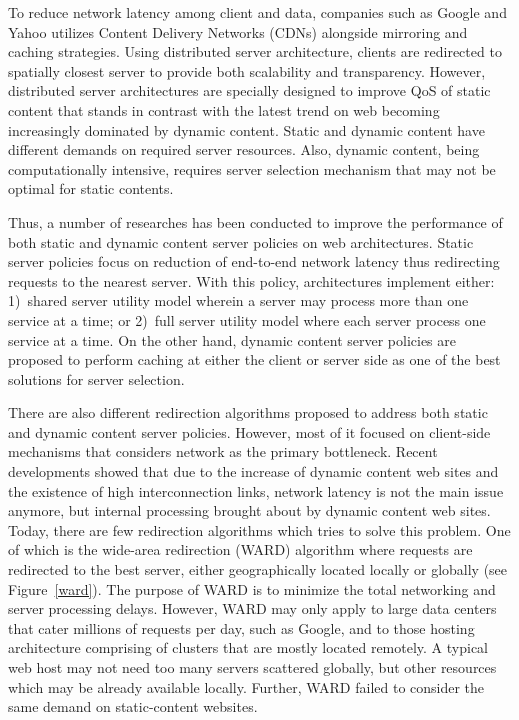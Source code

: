 \documentclass[preprint]{acm_proc_article-sp}
\begin{document}
To reduce network latency among client and data, companies such as Google and Yahoo utilizes Content Delivery Networks (CDNs) alongside mirroring and caching strategies. Using distributed server architecture, clients are redirected to spatially closest server to provide both scalability and transparency. However, distributed server architectures are specially designed to improve QoS of static content that stands in contrast with the latest trend on web becoming increasingly dominated by dynamic content. Static and dynamic content have different demands on required server resources. Also, dynamic content, being computationally intensive, requires server selection mechanism that may not be optimal for static contents.

Thus, a number of researches has been conducted to improve the performance of both static and dynamic content server policies on web architectures.  Static server policies focus on reduction of end-to-end network latency thus redirecting requests to the nearest server. With this policy, architectures implement either: 1)~shared server utility model wherein a server may process more than one service at  a time; or 2)~full server utility model where each server process one service at a time. On the other hand, dynamic content server policies are proposed to perform caching at either the client or server side as one of the best solutions for server selection.

There are also different redirection algorithms proposed to address both static and dynamic content server policies. However, most of it focused on client-side mechanisms that considers network as the primary bottleneck. Recent developments showed that due to the increase of dynamic content web sites and the existence of high interconnection links, network latency is not the main issue anymore, but internal processing brought about by dynamic content web sites. Today, there are few redirection algorithms which tries to solve this problem. One of which is the wide-area redirection (WARD) algorithm where requests are redirected to the best server, either geographically located locally or globally (see Figure~\ref{ward}). The purpose of WARD is to minimize the total networking and server processing delays.  However, WARD may only apply to large data centers that cater millions of requests per day, such as Google, and to those hosting architecture comprising of clusters that are mostly located remotely. A typical web host may not need too many servers scattered globally, but other resources which may be already available locally.  Further, WARD failed to consider the same demand on static-content websites.
\end{document}
